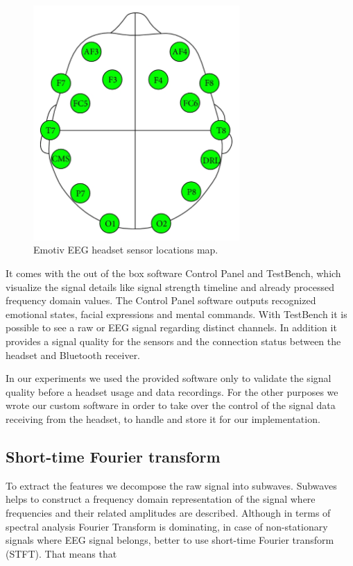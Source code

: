 \documentclass[12pt]{article}
\theoremstyle{definition}
\begin{document}
\begin{figure} [H]
\begin{center}
\includegraphics[width=0.7\textwidth]{emotiv_eeg}
\caption{Emotiv EEG headset sensor locations map. \cite{emotiv_eeg_pic}}
\label{fig:emotiv_eeg}
\end{center}
\end{figure}

It comes with the out of the box software Control Panel and TestBench, which visualize the signal details like signal strength timeline and already processed frequency domain values. The Control Panel software outputs recognized emotional states, facial expressions and mental commands. With TestBench it is possible to see a raw or EEG signal regarding distinct channels. In addition it provides a signal quality for the sensors and the connection status between the headset and Bluetooth receiver.

In our experiments we used the provided software only to validate the signal quality before a headset usage and data recordings. For the other purposes we wrote our custom software in order to take over the control of the signal data receiving from the headset, to handle and store it for our implementation.

\subsection{Short-time Fourier transform}

To extract the features we decompose the raw signal into subwaves. Subwaves helps to construct a frequency domain representation of the signal where frequencies and their related amplitudes are described. Although in terms of spectral analysis Fourier Transform is dominating, in case of non-stationary signals where EEG signal belongs, better to use short-time Fourier transform (STFT). \cite{alfahoum_fft} That means that
\end{document}
